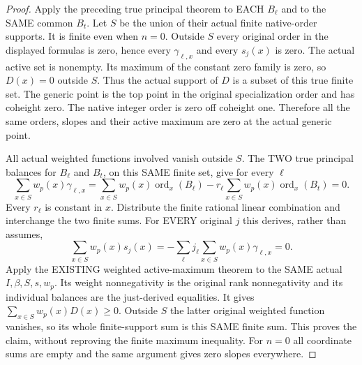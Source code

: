 \begin{proof}
Apply the preceding true principal theorem to EACH $B_\ell$ and to the
SAME common $B_t$. Let $S$ be the union of their actual finite native-order
supports. It is finite even when $n=0$. Outside $S$ every original order
in the displayed formulas is zero, hence every $\gamma_{\ell,x}$ and
every $s_j(x)$ is zero. The actual active set is nonempty. Its maximum
of the constant zero family is zero, so $D(x)=0$ outside $S$.
Thus the actual support of $D$ is a subset of this true finite set.
The generic point is the top point in the original specialization order
and has coheight zero. The native integer order is zero off coheight
one. Therefore all the same orders, slopes and their active maximum are
zero at the actual generic point.

All actual weighted functions involved vanish outside $S$. The TWO
true principal balances for $B_\ell$ and $B_t$, on this SAME finite set,
give for every $\ell$
\[
 \sum_{x\in S}w_p(x)\gamma_{\ell,x}
 =\sum_{x\in S}w_p(x)\operatorname{ord}_x(B_\ell)
    -r_\ell\sum_{x\in S}w_p(x)\operatorname{ord}_x(B_t)=0.
\]
Every $r_\ell$ is constant in $x$. Distribute the finite rational linear
combination and interchange the two finite sums. For EVERY original $j$
this derives, rather than assumes,
\[
 \sum_{x\in S}w_p(x)s_j(x)
   =-\sum_\ell j_\ell\sum_{x\in S}w_p(x)\gamma_{\ell,x}=0.
\]
Apply the EXISTING weighted active-maximum theorem to the SAME actual
$I,\beta,S,s,w_p$. Its weight nonnegativity is the original rank
nonnegativity and its individual balances are the just-derived equalities.
It gives $\sum_{x\in S}w_p(x)D(x)\ge0$. Outside $S$ the latter original
weighted function vanishes, so its whole finite-support sum is this
SAME finite sum. This proves the claim, without reproving the finite
maximum inequality. For $n=0$ all coordinate sums are empty and the same
argument gives zero slopes everywhere.
\end{proof}

